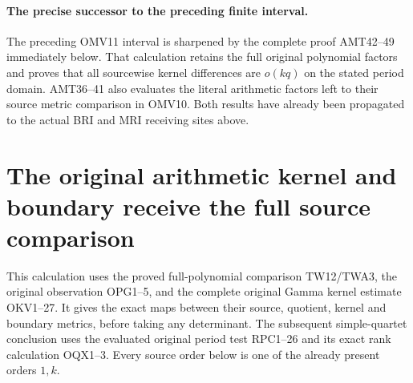 \documentclass[11pt,a4paper]{article}
\begin{document}

\paragraph{The precise successor to the preceding finite interval.}
The preceding OMV11 interval is sharpened by the complete proof
AMT42--49 immediately below. That calculation retains the full
original polynomial factors and proves that all sourcewise kernel
differences are $o(kq)$ on the stated period domain. AMT36--41
also evaluates the literal arithmetic factors left to their source
metric comparison in OMV10. Both results have already been
propagated to the actual BRI and MRI receiving sites above.

\section{The original arithmetic kernel and boundary receive the full source comparison}
\label{sec:AMT}

This calculation uses the proved full-polynomial comparison TW12/TWA3,
the original observation OPG1--5, and the complete original Gamma
kernel estimate OKV1--27. It gives the exact maps between their source,
quotient, kernel and boundary metrics, before taking any determinant.
The subsequent simple-quartet conclusion uses the evaluated original
period test RPC1--26 and its exact rank calculation OQX1--3. Every
source order below is one of the already present orders $1,k$.
\end{document}
